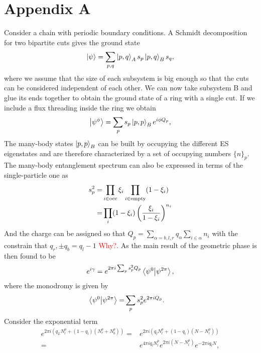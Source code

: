 \documentclass[twocolumn,amsmath,longbibliography,amssymb,superscriptaddress]{revtex4-1}
\begin{document}
	

	
\appendix

\section{Appendix A}
	
Consider a chain with periodic boundary conditions. A Schmidt decomposition for two bipartite cuts gives the ground state
\begin{equation}
\ket{\psi} = \sum_{p,q} \ket{p,q}_A s_p \ket{p,q}_B s_q,
\end{equation}
where we assume that the size of each subsystem is big enough so that the cuts can be considered independent of each other. We can now take subsystem B and glue its ends together to obtain the ground state of a ring with a single cut. If we include a flux threading inside the ring we obtain
\begin{equation}
\ket{\psi^\phi} = \sum_p s_p \ket{p,p}_B e^{i\phi Q_p},
\end{equation}
The many-body states $\ket{p,p}_B$ can be built by occupying the different ES eigenstates and are therefore characterized by a set of occupying numbers $\{n\}_p$. The many-body entanglement spectrum can also be expressed in terms of the single-particle one \cite{Alexandrinata2011} as
\begin{align}
s_p^2 =& \prod_{i \in {\rm occ}} \xi_i \prod_{i \in {\rm empty}}(1-\xi_i) \\
=& \prod_i (1-\xi_i)\left(\frac{\xi_i}{1-\xi_i} \right)^{n_i}
\end{align}
And the charge can be assigned so that $Q_p = \sum_{\alpha = b,l,r} q_\alpha\sum_{i \in \alpha} n_i$ with the constrain that $q_r,\pm q_b = q_l-1$ \textcolor{red}{Why?}. As the main result of \cite{Zaletel2014} the geometric phase is then found to be
\begin{align}
e^{i\gamma} = e^{2\pi i \sum_p s_p^2 Q_p}  \bra{\psi^0}\ket{\psi^{2\pi}},
\label{zaletel}
\end{align}
where the monodromy is given by
\begin{align}
\bra{\psi^0}\ket{\psi^{2\pi}} =& \sum_p s_p^2 e^{2\pi i Q_p}.
\end{align}
Consider the exponential term
\begin{align*}
e^{2\pi i (q_L N^p_l + (1-q_l)(N^p_r+N^p_b))} =& e^{2\pi i (q_l N^p_l + (1-q_l)(N-N^p_l))} \\
=& e^{4\pi i q_l N^p_l}e^{2 \pi i (N-N^p_l)}e^{-2\pi i q_l N },
\end{align*}
\end{document}
